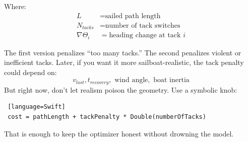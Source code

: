 Where:
\begin{align}
L &= \text{sailed path length} \\
N_{tacks} &= \text{number of tack switches} \\
\nabla \Theta_{i} &= \text{heading change at tack } i
\end{align}


The first version penalizes “too many tacks.”
The second penalizes violent or inefficient tacks.
Later, if you want it more sailboat-realistic, the tack penalty could depend on:
\[ v_{lost}, t_{recovery}, \text{ wind angle}, \text{ boat inertia} \]
​	
But right now, don’t let realism poison the geometry. Use a symbolic knob:

\begin{lstlisting} [language=Swift]
 cost = pathLength + tackPenalty * Double(numberOfTacks) 
\end{lstlisting}

That is enough to keep the optimizer honest without drowning the model.




